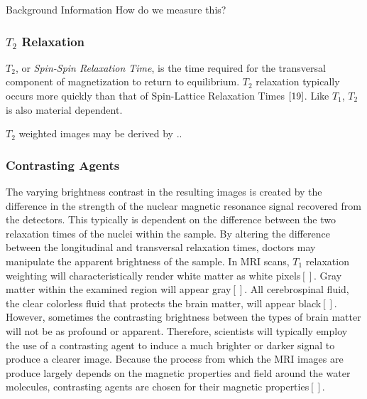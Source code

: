 \documentclass[a4paper,12pt]{article}
\begin{document}
\begin{section}{Background Information}
How do we measure this?

\subsubsection{$T_2$ Relaxation}
$T_2$, or {\em Spin-Spin Relaxation Time}, is the time required for the transversal component of magnetization to return to equilibrium. $T_2$ relaxation typically occurs more quickly than that of Spin-Lattice Relaxation Times $\cite{19}$. Like $T_1$, $T_2$ is also material dependent. 

$T_2$ weighted images may be derived by ..

\subsubsection{Contrasting Agents}

The varying brightness contrast in the resulting images is created by the difference in the strength of the nuclear magnetic resonance signal recovered from the detectors. This typically is dependent on the difference between the two relaxation times of the nuclei within the sample. By altering the difference between the longitudinal and transversal relaxation times, doctors may manipulate the apparent brightness of the sample. In MRI scans, $T_1$ relaxation weighting will characteristically render white matter as white pixels$[]$.%
Gray matter within the examined region will appear gray$[]$.%
All cerebrospinal fluid, the clear colorless fluid that protects the brain matter, will appear black$[]$.%
However, sometimes the contrasting brightness between the types of brain matter will not be as profound or apparent. Therefore, scientists will typically employ the use of a contrasting agent to induce a much brighter or darker signal to produce a clearer image. Because the process from which the MRI images are produce largely depends on the magnetic properties and field around the water molecules, contrasting agents are chosen for their magnetic properties$[]$.\\%


\end{section}
\end{document}
